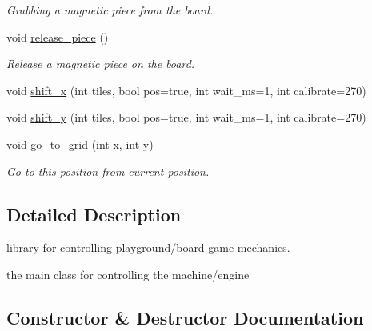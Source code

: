 \begin{DoxyCompactItemize}
\begin{DoxyCompactList}\small\item\em Grabbing a magnetic piece from the board. \end{DoxyCompactList}\item 
void \hyperlink{classboard__engine_a78886dc412881896d5146d3ab17f0c78}{release\+\_\+piece} ()\hypertarget{classboard__engine_a78886dc412881896d5146d3ab17f0c78}{}\label{classboard__engine_a78886dc412881896d5146d3ab17f0c78}

\begin{DoxyCompactList}\small\item\em Release a magnetic piece on the board. \end{DoxyCompactList}\item 
void \hyperlink{classboard__engine_ae35de404be745a7debab47f4ec4066bc}{shift\+\_\+x} (int tiles, bool pos=true, int wait\+\_\+ms=1, int calibrate=270)
\item 
void \hyperlink{classboard__engine_a6391f73d6b4ae663d2d3c515bd208a64}{shift\+\_\+y} (int tiles, bool pos=true, int wait\+\_\+ms=1, int calibrate=270)
\item 
void \hyperlink{classboard__engine_aea1ba002132d33ed8cf714a411996190}{go\+\_\+to\+\_\+grid} (int x, int y)
\begin{DoxyCompactList}\small\item\em Go to this position from current position. \end{DoxyCompactList}\end{DoxyCompactItemize}


\subsection{Detailed Description}
library for controlling playground/board game mechanics. 

the main class for controlling the machine/engine 

\subsection{Constructor \& Destructor Documentation}

